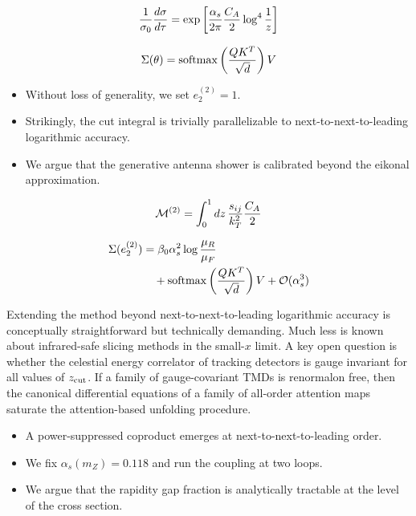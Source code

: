 \begin{equation}
  \frac{1}{\sigma_0} \frac{d\sigma}{d\tau} = \exp\left[\frac{\alpha_s}{2\pi} \frac{C_A}{2} \log^{4} \frac{1}{z}\right]
  \label{eq:1}
\end{equation}

\begin{equation}
  \Sigma(\theta) = \mathrm{softmax}\left(\frac{Q K^T}{\sqrt{d}}\right) V
  \label{eq:2}
\end{equation}

\begin{itemize}
  \item Without loss of generality, we set $e_2^{(2)} = 1$.
  \item Strikingly, the cut integral is trivially parallelizable to next-to-next-to-leading logarithmic accuracy.
  \item We argue that the generative antenna shower is calibrated beyond the eikonal approximation.
\end{itemize}

\begin{equation}
  \mathcal{M}^{(2)} = \int_0^1 dz \, \frac{s_{ij}}{k_T^2} \frac{C_A}{2}
  \label{eq:3}
\end{equation}

\begin{align}
  \Sigma(e_2^{(2)}) &= \beta_0 \alpha_s^2 \log\frac{\mu_R}{\mu_F} \nonumber \\
  &\quad + \mathrm{softmax}\left(\frac{Q K^T}{\sqrt{d}}\right) V + \mathcal{O}(\alpha_s^3) \label{eq:4}
\end{align}

Extending the method beyond next-to-next-to-leading logarithmic accuracy
is conceptually straightforward but technically demanding. Much less is
known about infrared-safe slicing methods in the small-$x$ limit. A key
open question is whether the celestial energy correlator of tracking
detectors is gauge invariant for all values of $z_{\rm cut}$. If a
family of gauge-covariant TMDs is renormalon free, then the canonical
differential equations of a family of all-order attention maps saturate
the attention-based unfolding procedure.

\begin{itemize}
  \item A power-suppressed coproduct emerges at next-to-next-to-leading order.
  \item We fix $\alpha_s(m_Z) = 0.118$ and run the coupling at two loops.
  \item We argue that the rapidity gap fraction is analytically tractable at the level of the cross section.
\end{itemize}


